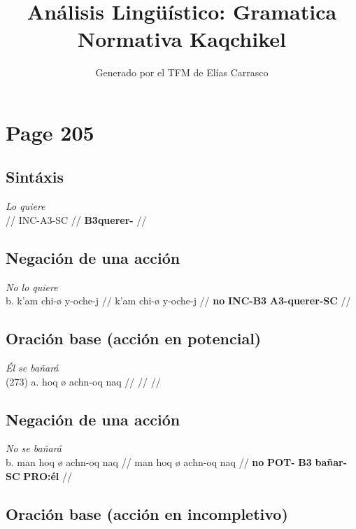 \documentclass{article}%
\title{Análisis Lingüístico: Gramatica Normativa Kaqchikel}%
\author{Generado por el TFM de Elías Carrasco}%
\begin{document}
%
\normalsize%
\maketitle%
\section{Page 205}%
\label{sec:Page205}%
\subsection{Sintáxis}%
\label{subsec:Sintxis}%

%
\par\medskip%
\ex
\textit{Lo quiere} \\
\begingl
\gla  //
\glb INC-A3-SC //
\glc \textbf{B3}\textbf{querer-}\textbf{} //
\endgl
\xe
%
\medskip%
\subsection{Negación de una acción}%
\label{subsec:Negacindeunaaccin}%

%
\par\medskip%
\ex
\textit{No lo quiere} \\
\begingl
\gla b. k’am chi-ø y-oche-j //
\glb k’am chi-ø y-oche-j //
\glc \textbf{no} \textbf{INC-}\textbf{B3} \textbf{A3-}\textbf{querer-}\textbf{SC} //
\endgl
\xe
%
\medskip%
\subsection{Oración base (acción en potencial)}%
\label{subsec:Oracinbase(accinenpotencial)}%

%
\par\medskip%
\ex
\textit{Él se bañará} \\
\begingl
\gla (273) a. hoq ø achn-oq naq //
\glb  //
\glc  //
\endgl
\xe
%
\medskip%
\subsection{Negación de una acción}%
\label{subsec:Negacindeunaaccin}%

%
\par\medskip%
\ex
\textit{No se bañará} \\
\begingl
\gla b. man hoq ø achn-oq naq //
\glb man hoq ø achn-oq naq //
\glc \textbf{no} \textbf{POT-} \textbf{B3} \textbf{bañar-}\textbf{SC} \textbf{PRO:él} //
\endgl
\xe
%
\medskip%
\subsection{Oración base (acción en incompletivo)}%
\label{subsec:Oracinbase(accinenincompletivo)}%
\end{document}
